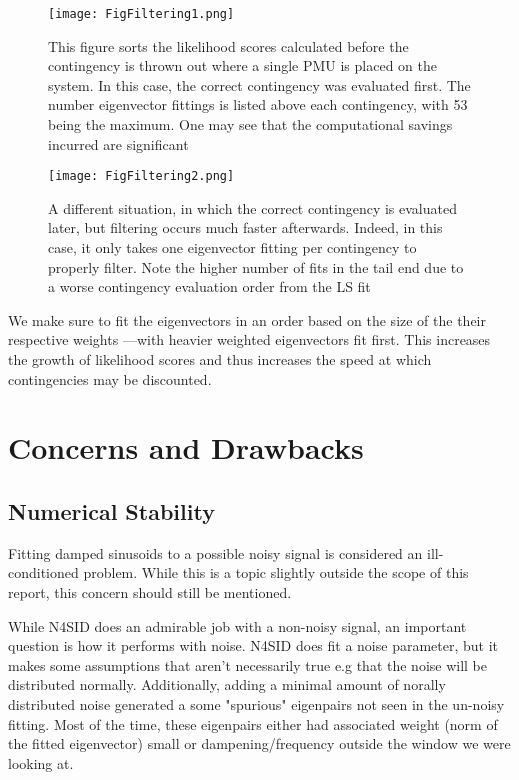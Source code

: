 \begin{figure}[h!]
    \centering
    \texttt{[image: FigFiltering1.png]}
    \caption{This figure sorts the likelihood scores calculated before the contingency is thrown out where a single PMU is placed on the system. In this case, the correct contingency was evaluated first. The number eigenvector fittings is listed above each contingency, with 53 being the maximum. One may see that the computational savings incurred are significant}
    \label{FigFiltering1}
    \centering
    \texttt{[image: FigFiltering2.png]}
    \caption{A different situation, in which the correct contingency is evaluated later, but filtering occurs much faster afterwards. Indeed, in this case, it only takes one eigenvector fitting per contingency to properly filter. Note the higher number of fits in the tail end due to a worse contingency evaluation order from the LS fit}
    \label{FigFiltering2}
\end{figure}

We make sure to fit the eigenvectors in an order based on the size of the their respective weights ---with heavier weighted eigenvectors fit first. This increases the growth of likelihood scores and thus increases the speed at which contingencies may be discounted. 

\clearpage

\section{Concerns and Drawbacks}
\subsection{Numerical Stability}
Fitting damped sinusoids to a possible noisy signal is considered an ill-conditioned problem. While this is a topic slightly outside the scope of this report, this concern should still be mentioned. 

While N4SID does an admirable job with a non-noisy signal, an important question is how it performs with noise. N4SID does fit a noise parameter, but it makes some assumptions that aren't necessarily true e.g that the noise will be distributed normally. Additionally, adding a minimal amount of norally distributed noise generated a some "spurious" eigenpairs not seen in the un-noisy fitting. Most of the time, these eigenpairs either had associated weight (norm of the fitted eigenvector) small or dampening/frequency outside the window we were looking at. 

